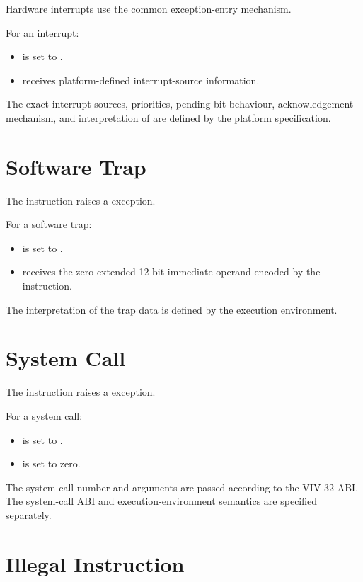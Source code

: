 Hardware interrupts use the common exception-entry mechanism.

For an interrupt:

\begin{itemize}
\item {} is set to .
\item {} receives platform-defined interrupt-source information.
\end{itemize}

The exact interrupt sources, priorities, pending-bit behaviour, acknowledgement mechanism,
and interpretation of  are defined by the platform specification.

\section{Software Trap}

The  instruction raises a  exception.

For a software trap:

\begin{itemize}
\item {} is set to .
\item {} receives the zero-extended 12-bit immediate operand encoded by the
 instruction.
\end{itemize}

The interpretation of the trap data is defined by the execution environment.

\section{System Call}

The  instruction raises a  exception.

For a system call:

\begin{itemize}
\item {} is set to .
\item {} is set to zero.
\end{itemize}

The system-call number and arguments are passed according to the VIV-32 ABI.
The system-call ABI and execution-environment semantics are specified separately.

\section{Illegal Instruction}

